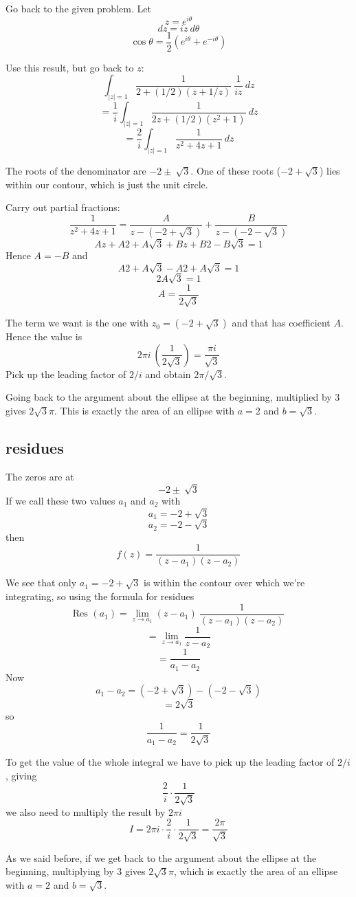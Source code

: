 \documentclass[11pt, oneside]{article}
\begin{document}
Go back to the given problem.  Let
\[ z = e^{i\theta} \]
\[ dz = i z \ d \theta \]
\[ \cos \theta = \frac{1}{2}(e^{i\theta} + e^{-i \theta} ) \]

Use this result, but go back to $z$:
\[ \int_{|z|=1} \frac{1}{2 + (1/2)(z + 1/z)} \ \frac{1}{iz} \ dz \]
\[ = \frac{1}{i}  \int_{|z|=1} \frac{1}{2z + (1/2)(z^2 + 1)} \ dz \]
\[ = \frac{2}{i}  \int_{|z|=1} \frac{1}{z^2 + 4z + 1} \ dz \]

The roots of the denominator are $-2 \pm \ \sqrt{3}$.  One of these roots ($-2 + \sqrt{3}$) lies within our contour, which is just the unit circle.

Carry out partial fractions:
\[ \frac{1}{z^2 + 4z + 1} = \frac{A}{z - (-2 + \sqrt{3})} + \frac{B}{z - (-2 - \sqrt{3})} \]
\[ Az + A2 + A \sqrt{3} + Bz + B2 - B \sqrt{3} = 1 \]
Hence $A = -B$ and
\[ A2 + A \sqrt{3} -A2 + A \sqrt{3} = 1 \]
\[ 2A \sqrt{3} = 1 \]
\[ A = \frac{1}{2 \sqrt{3}} \]

The term we want is the one with $z_0 = (-2 + \sqrt{3})$ and that has coefficient $A$.  Hence the value is
\[ 2 \pi i \ (\frac{1}{2 \sqrt{3}}) = \frac{\pi i}{\sqrt{3}} \]
Pick up the leading factor of $2/i$ and obtain $2 \pi / \sqrt{3}$.

Going back to the argument about the ellipse at the beginning, multiplied by $3$ gives $2 \sqrt{3} \pi$.  This is exactly the area of an ellipse with $a = 2$ and $b = \sqrt{3}$.

\subsection*{residues}

The zeros are at 
\[ -2 \pm \ \sqrt{3} \]
If we call these two values $a_1$ and $a_2$ with
\[ a_1 = -2 + \sqrt{3} \]
\[ a_2 = -2 - \sqrt{3} \]
then
\[ f(z) = \frac{1}{(z - a_1)(z - a_2)} \]

We see that only $a_1 = -2 + \sqrt{3}$ is within the contour over which we're integrating, so using the formula for residues
\[ \text{Res }(a_1) = \lim_{z \rightarrow a_1} (z - a_1) \ \frac{1}{(z - a_1)(z - a_2)} \]
\[ = \lim_{z \rightarrow a_1} \frac{1}{z - a_2} \]
\[ = \frac{1}{a_1 - a_2} \]
Now
\[ a_1 - a_2 = (-2 + \sqrt{3} ) - (-2 - \sqrt{3} ) \]
\[ = 2 \sqrt{3} \]
so
\[ \frac{1}{a_1 - a_2} = \frac{1}{2 \sqrt{3}} \]

To get the value of the whole integral we have to pick up the leading factor of $2/i$, giving
\[ \frac{2}{i} \cdot \frac{1}{2 \sqrt{3}} \]
we also need to multiply the result by $2 \pi i$
\[ I = 2 \pi i \cdot \frac{2}{i} \cdot \frac{1}{2 \sqrt{3}} = \frac{2 \pi}{\sqrt{3}} \]

As we said before, if we get back to the argument about the ellipse at the beginning, multiplying by $3$ gives $2 \sqrt{3} \pi$, which is exactly the area of an ellipse with $a = 2$ and $b = \sqrt{3}$.
\end{document}
